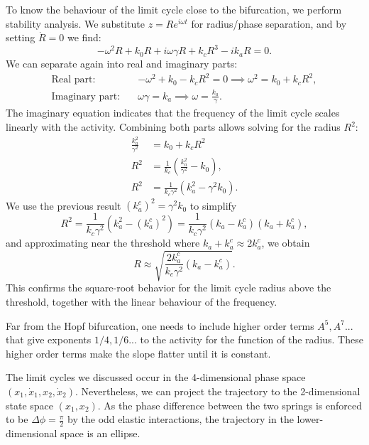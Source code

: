 \documentclass[11pt, a4paper]{article} %
\newcommand{\xd}{\dot{x}}
\begin{document}
To know the behaviour of the limit cycle close to the bifurcation, we perform stability analysis. 
We substitute $z = R e^{i\omega t}$ for radius/phase separation, and by setting $\dot{R} = 0$ we find:
\begin{equation}
-\omega^2 R + k_0 R + i \omega \gamma R + k_c R^3 - i k_a R = 0.
\end{equation}
We can separate again into real and imaginary parts:
\begin{align}
\text{Real part:} \quad & -\omega^2 + k_0 - k_c R^2 = 0 \implies \omega^2 = k_0 + k_c R^2, \\
\text{Imaginary part:} \quad & \omega \gamma = k_a \implies \omega = \frac{k_a}{\gamma}.
\end{align}
The imaginary equation indicates that the frequency of the limit cycle scales linearly with the activity.
Combining both parts allows solving for the radius $R^2$:
\begin{align}
\frac{k_a^2}{\gamma^2} &= k_0 + k_c R^2 \\
R^2 &= \frac{1}{k_c} \left( \frac{k_a^2}{\gamma^2} - k_0 \right) ,\\
R^2 &= \frac{1}{k_c \gamma^2} \left( k_a^2 - \gamma^2 k_0 \right) .
\end{align}
We use the previous result $(k_a^c)^2 = \gamma^2 k_0$ to simplify
\begin{equation}
R^2 = \frac{1}{k_c \gamma^2} \left( k_a^2 - (k_a^c)^2 \right) = \frac{1}{k_c \gamma^2} (k_a - k_a^c)(k_a + k_a^c),
\end{equation}
and approximating near the threshold where $k_a + k_a^c \approx 2k_a^c$, we obtain
\begin{equation}
R \approx \sqrt{\frac{2 k_a^c}{k_c \gamma^2} (k_a - k_a^c)}.
\end{equation}
This confirms the square-root behavior for the limit cycle radius above the threshold, 
together with the linear behaviour of the frequency. 

Far from the Hopf bifurcation, one needs to include higher order terms $A^5, A^7$... that give exponents $1/4, 1/6$... 
to the activity for the function of the radius. These higher order terms make the slope flatter until it is constant. 

The limit cycles we discussed occur in the 4-dimensional phase space $(x_1, \xd_1, x_2, \xd_2)$. Nevertheless, we can project the trajectory 
to the 2-dimensional state space $(x_1, x_2)$. As the phase difference between the two springs is enforced to be $\Delta\phi=\frac{\pi}{2}$ 
by the odd elastic interactions, the trajectory in the lower-dimensional space is an ellipse. 
\end{document}
